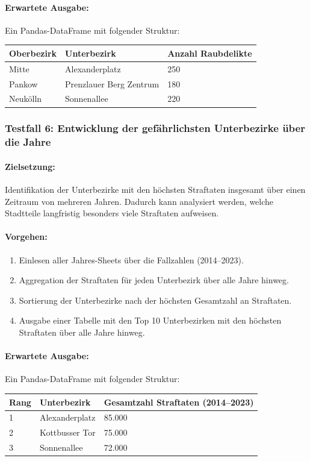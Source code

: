 \documentclass[11pt,a4paper]{article}
\begin{document}
\paragraph{Erwartete Ausgabe:}
Ein Pandas-DataFrame mit folgender Struktur:
\begin{center}
    \begin{tabular}{|l|l|l|}
        \hline
        \textbf{Oberbezirk} & \textbf{Unterbezirk} & \textbf{Anzahl Raubdelikte} \\
        \hline
        Mitte & Alexanderplatz & 250 \\
        Pankow & Prenzlauer Berg Zentrum & 180 \\
        Neukölln & Sonnenallee & 220 \\
        \hline
    \end{tabular}
\end{center}

\subsubsection{Testfall 6: Entwicklung der gefährlichsten Unterbezirke über die Jahre}
\paragraph{Zielsetzung:}
Identifikation der Unterbezirke mit den höchsten Straftaten insgesamt über einen Zeitraum von mehreren Jahren. Dadurch kann analysiert werden, welche Stadtteile langfristig besonders viele Straftaten aufweisen.

\paragraph{Vorgehen:}
\begin{enumerate}
    \item Einlesen aller Jahres-Sheets über die Fallzahlen (2014–2023).
    \item Aggregation der Straftaten für jeden Unterbezirk über alle Jahre hinweg.
    \item Sortierung der Unterbezirke nach der höchsten Gesamtzahl an Straftaten.
    \item Ausgabe einer Tabelle mit den Top 10 Unterbezirken mit den höchsten Straftaten über alle Jahre hinweg.
\end{enumerate}

\paragraph{Erwartete Ausgabe:}
Ein Pandas-DataFrame mit folgender Struktur:
\begin{center}
    \begin{tabular}{|l|l|l|}
        \hline
        \textbf{Rang} & \textbf{Unterbezirk} & \textbf{Gesamtzahl Straftaten (2014–2023)} \\
        \hline
        1 & Alexanderplatz & 85.000 \\
        2 & Kottbusser Tor & 75.000 \\
        3 & Sonnenallee & 72.000 \\
        \hline
    \end{tabular}
\end{center}
\end{document}
